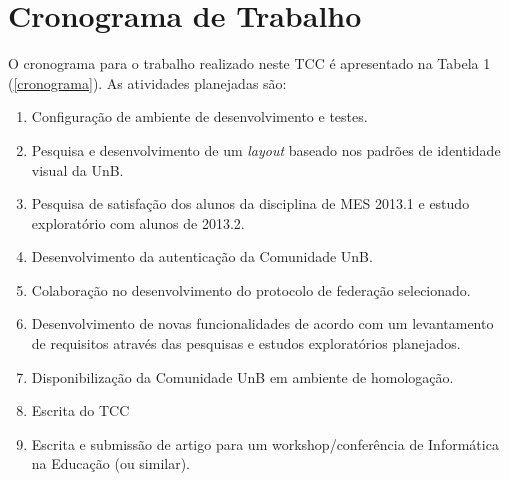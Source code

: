 \section{Cronograma de Trabalho}

O cronograma para o trabalho realizado neste TCC é apresentado na Tabela 1 
(\ref{cronograma}). As atividades planejadas são:

\begin{enumerate}
	\item Configuração de ambiente de desenvolvimento e testes.
	\item Pesquisa e desenvolvimento de um \textit{layout} baseado nos
	padrões de identidade visual da UnB.
	\item Pesquisa de satisfação dos alunos da disciplina de MES 2013.1 e
	estudo exploratório com alunos de 2013.2.
	\item Desenvolvimento da autenticação da Comunidade UnB.
	\item Colaboração no desenvolvimento do protocolo de federação
	selecionado.
	\item Desenvolvimento de novas funcionalidades de acordo com um
	levantamento de requisitos através das pesquisas e estudos exploratórios
	planejados.
	\item Disponibilização da Comunidade UnB em ambiente de homologação.
	\item Escrita do TCC
	\item Escrita e submissão de artigo para um workshop/conferência de
	Informática na Educação (ou similar).
\end{enumerate}

